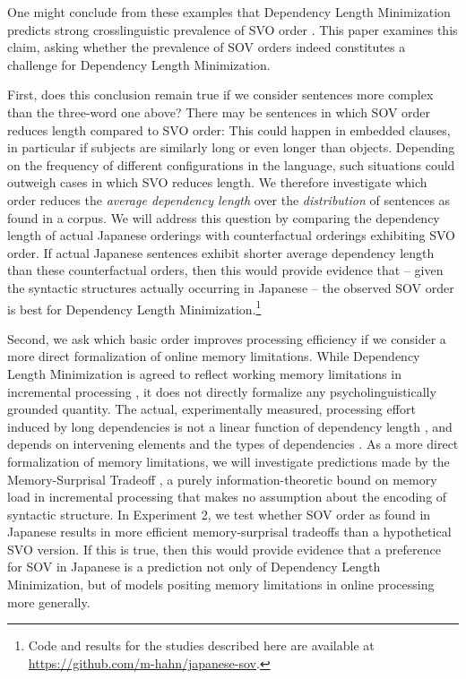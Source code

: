 \documentclass[11pt,a4paper]{article}
\begin{document}
One might conclude from these examples that Dependency Length Minimization predicts strong crosslinguistic prevalence of SVO order \citep{ferrer-i-cancho-placement-2017}.
This paper examines this claim, asking whether the prevalence of SOV orders indeed constitutes a challenge for Dependency Length Minimization.

First, does this conclusion remain true if we consider sentences more complex than the three-word one above? 
There may be sentences in which SOV order reduces length compared to SVO order:
This could happen in embedded clauses, in particular if subjects are similarly long or even longer than objects.
Depending on the frequency of different configurations in the language, such situations could outweigh cases in which SVO reduces length.
We therefore investigate which order reduces the \emph{average dependency length} over the \emph{distribution} of sentences as found in a corpus.
We will address this question by comparing the dependency length of actual Japanese orderings with counterfactual orderings exhibiting SVO order.
If actual Japanese sentences exhibit shorter average dependency length than these counterfactual orders, then this would provide evidence that -- given the syntactic structures actually occurring in Japanese -- the observed SOV order is best for Dependency Length Minimization.\footnote{Code and results for the studies described here are available at \url{https://github.com/m-hahn/japanese-sov}.}

Second, we ask which basic order improves processing efficiency
if we consider a more direct formalization of online memory limitations.
While Dependency Length Minimization is agreed to reflect working memory limitations in incremental processing \citep{hawkins1994performance, futrell2015largescale, temperley2018minimizing}, it does not directly formalize any psycholinguistically grounded quantity.
The actual, experimentally measured, processing effort induced by long dependencies is not a linear function of dependency length \citep{gibson1998linguistic}, and depends on intervening elements \citep{gibson1998linguistic, lewis-activation-based-2005} and the types of dependencies \citep{demberg-data-2008}.
As a more direct formalization of memory limitations, we will  investigate predictions made by 
the Memory-Surprisal Tradeoff \citep{hahn2019memory}, a purely information-theoretic bound on memory load in incremental processing that makes no assumption about the encoding of syntactic structure.
In Experiment 2, we test whether SOV order as found in Japanese results in more efficient memory-surprisal tradeoffs than a hypothetical SVO version.
If this is true, then this would provide evidence that a preference for SOV in Japanese is a prediction not only of Dependency Length Minimization, but of models positing memory limitations in online processing more generally.
\end{document}
